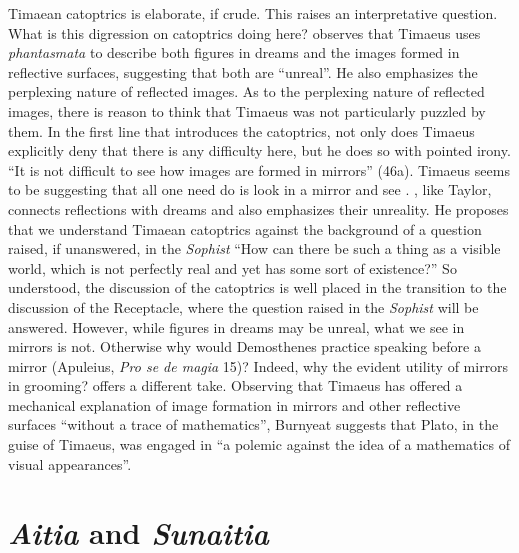 Timaean catoptrics is elaborate, if crude. This raises an interpretative question. What is this digression on catoptrics doing here? \citet[285]{Taylor:1928qb} observes that Timae\-us uses \emph{phantasmata} to describe both figures in dreams and the images formed in reflective surfaces, suggesting that both are ``unreal''. He also emphasizes the perplexing nature of reflected images. As to the perplexing nature of reflected images, there is reason to think that Timaeus was not particularly puzzled by them. In the first line that introduces the catoptrics, not only does Timaeus explicitly deny that there is any difficulty here, but he does so with pointed irony. ``It is not difficult to see how images are formed in mirrors'' (46a). Timaeus seems to be suggesting that all one need do is look in a mirror and see \citep[47]{Burnyeat:2005rc}. \citet[156]{Cornford:1935fk}, like Taylor, connects reflections with dreams and also emphasizes their unreality. He proposes that we understand Timaean catoptrics against the background of a question raised, if unanswered, in the \emph{Sophist} ``How can there be such a thing as a visible world, which is not perfectly real and yet has some sort of existence?'' So understood, the discussion of the catoptrics is well placed in the transition to the discussion of the Receptacle, where the question raised in the \emph{Sophist} will be answered. However, while figures in dreams may be unreal, what we see in mirrors is not. Otherwise why would Demosthenes practice speaking before a mirror (Apuleius, \emph{Pro se de magia} 15)? Indeed, why the evident utility of mirrors in grooming? \citet[47--8]{Burnyeat:2005rc} offers a different take. Observing that Timaeus has offered a mechanical explanation of image formation in mirrors and other reflective surfaces ``without a trace of mathematics'', Burnyeat suggests that Plato, in the guise of Timaeus, was engaged in ``a polemic against the idea of a mathematics of visual appearances''. 


\section{\emph{Aitia} and \emph{Sunaitia}} %
\label{sec:_emph_aitia_and_emph_sunaitia}

